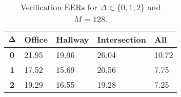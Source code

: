 \begin{table}[h]
    \centering
    \begin{tabular}{|c|M{2cm}|M{2cm}|M{2cm}|M{2cm}|}
    \hline
    $\boldsymbol{\Delta}$ & \bf{Office} & \bf{Hallway} & \bf{Intersection} & \bf{All} \\ 
    \hline 
    \hline
    \bf{0} & 21.95 & 19.96 & 26.04 & 10.72 \\
    \hline
    \bf{1} & 17.52 & 15.69 & 20.56 & 7.75 \\
    \hline
    \bf{2} & 19.29 & 16.55 & 19.28 & 7.25 \\
    \hline
    \end{tabular}
    \caption{Verification EERs for $\Delta \in \{0, 1, 2\}$ and $M = 128$.}
    \label{tab:verify_adapted_mv_M_128}
\end{table}
